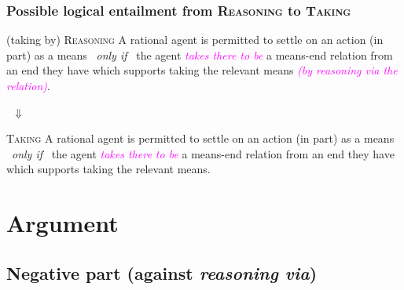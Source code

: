 \documentclass[noamssymb,
graphics,
]{beamer} %
\newcommand{\schemaName}[1]{\textsc{#1}}
\begin{document}
\begin{frame}
  \frametitle{Possible logical entailment from \schemaName{Reasoning} to \schemaName{Taking}}

  \begin{block}{(taking by) \schemaName{Reasoning}}
   A rational agent is permitted to settle on an action (in part) as a means
    \newline
    \mbox{ }\hfill\emph{only if}\hfill\mbox{ }
    \newline
    the agent \textcolor{fuchsia}{\emph{takes there to be}} a means-end relation from an end they have which supports taking the relevant means \textcolor{fuchsia}{\emph{(by reasoning via the relation)}}.
  \end{block}

  {\Large \mbox{ }\hfill\(\Downarrow\)\hfill\mbox{ }}

  \begin{block}{\schemaName{Taking}}
    A rational agent is permitted to settle on an action (in part) as a means
    \newline
    \mbox{ }\hfill\emph{only if}\hfill\mbox{ }
    \newline
    the agent \textcolor{fuchsia}{\emph{takes there to be}} a means-end relation from an end they have which supports taking the relevant means.
  \end{block}

\end{frame}


\section{Argument}
\label{sec:argument}


\subsection{Negative part (against \emph{reasoning via})}%
\label{sec:negative}
\end{document}
